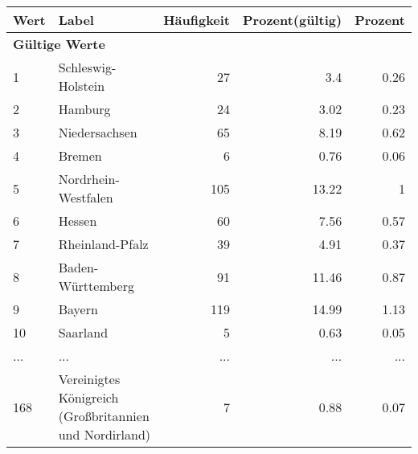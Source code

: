      \begin{longtable}{lXrrr}
     \toprule
     \textbf{Wert} & \textbf{Label} & \textbf{Häufigkeit} & \textbf{Prozent(gültig)} & \textbf{Prozent} \\
     \endhead
     \midrule
     \multicolumn{5}{l}{\textbf{Gültige Werte}}\\
        1 & \multicolumn{1}{X}{Schleswig-Holstein} & %
          \num{27} &
          \num[round-mode=places,round-precision=2]{3.4} &
          \num[round-mode=places,round-precision=2]{0.26} \\
        2 & \multicolumn{1}{X}{Hamburg} & %
          \num{24} &
          \num[round-mode=places,round-precision=2]{3.02} &
          \num[round-mode=places,round-precision=2]{0.23} \\
        3 & \multicolumn{1}{X}{Niedersachsen} & %
          \num{65} &
          \num[round-mode=places,round-precision=2]{8.19} &
          \num[round-mode=places,round-precision=2]{0.62} \\
        4 & \multicolumn{1}{X}{Bremen} & %
          \num{6} &
          \num[round-mode=places,round-precision=2]{0.76} &
          \num[round-mode=places,round-precision=2]{0.06} \\
        5 & \multicolumn{1}{X}{Nordrhein-Westfalen} & %
          \num{105} &
          \num[round-mode=places,round-precision=2]{13.22} &
          \num[round-mode=places,round-precision=2]{1} \\
        6 & \multicolumn{1}{X}{Hessen} & %
          \num{60} &
          \num[round-mode=places,round-precision=2]{7.56} &
          \num[round-mode=places,round-precision=2]{0.57} \\
        7 & \multicolumn{1}{X}{Rheinland-Pfalz} & %
          \num{39} &
          \num[round-mode=places,round-precision=2]{4.91} &
          \num[round-mode=places,round-precision=2]{0.37} \\
        8 & \multicolumn{1}{X}{Baden-Württemberg} & %
          \num{91} &
          \num[round-mode=places,round-precision=2]{11.46} &
          \num[round-mode=places,round-precision=2]{0.87} \\
        9 & \multicolumn{1}{X}{Bayern} & %
          \num{119} &
          \num[round-mode=places,round-precision=2]{14.99} &
          \num[round-mode=places,round-precision=2]{1.13} \\
        10 & \multicolumn{1}{X}{Saarland} & %
          \num{5} &
          \num[round-mode=places,round-precision=2]{0.63} &
          \num[round-mode=places,round-precision=2]{0.05} \\
       ... & ... & ... & ... & ... \\
        168 & \multicolumn{1}{X}{Vereinigtes Königreich (Großbritannien und Nordirland)} & %
          \num{7} &
          \num[round-mode=places,round-precision=2]{0.88} &
          \num[round-mode=places,round-precision=2]{0.07} \\


\end{longtable}
